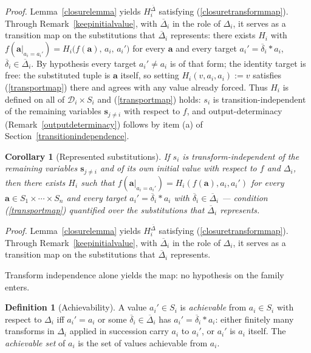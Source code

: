 \documentclass{article}
\newtheorem{corollary}[proposition]{Corollary}
\theoremstyle{definition}
\newtheorem{definition}[proposition]{Definition}
\theoremstyle{remark}
\begin{document}
\noindent \textit{Proof.} Lemma~\ref{closurelemma} yields $H_i^{\overline{\Delta}}$ satisfying (\ref{closuretransformmap}). Through Remark~\ref{keepinitialvalue}, with $\overline{\Delta}_i$ in the role of $\Delta_i$, it serves as a transition map on the substitutions that $\overline{\Delta}_i$ represents: there exists $H_i$ with $f(\boldsymbol{a}|_{a_i = a_i'}) = H_i\bigl(f(\boldsymbol{a}),\, a_i,\, a_i'\bigr)$ for every $\boldsymbol{a}$ and every target $a_i' = \overline{\delta}_i \ast a_i$, $\overline{\delta}_i \in \overline{\Delta}_i$. By hypothesis every target $a_i' \neq a_i$ is of that form; the identity target is free: the substituted tuple is $\boldsymbol{a}$ itself, so setting $H_i(v, a_i, a_i) := v$ satisfies (\ref{transportmap}) there and agrees with any value already forced. Thus $H_i$ is defined on all of $\mathcal{D}_i \times S_i$ and (\ref{transportmap}) holds: $s_i$ is transition-independent of the remaining variables $\boldsymbol{s}_{j \neq i}$ with respect to $f$, and output-determinacy (Remark~\ref{outputdeterminacy}) follows by item (a) of Section~\ref{transitionindependence}.

\newpage
\begin{corollary}[Represented substitutions]
\label{representedsubstitutions}
If $s_i$ is transform-independent of the remaining variables $\boldsymbol{s}_{j \neq i}$ and of its own initial value with respect to $f$ and $\Delta_i$, then there exists $H_i$ such that $f(\boldsymbol{a}|_{a_i = a_i'}) = H_i(f(\boldsymbol{a}), a_i, a_i')$ for every $\boldsymbol{a} \in S_1 \times \cdots \times S_n$ and every target $a_i' = \overline{\delta}_i \ast a_i$ with $\overline{\delta}_i \in \overline{\Delta}_i$ --- condition (\ref{transportmap}) quantified over the substitutions that $\overline{\Delta}_i$ represents.
\end{corollary}

\noindent \textit{Proof.} Lemma~\ref{closurelemma} yields $H_i^{\overline{\Delta}}$ satisfying (\ref{closuretransformmap}). Through Remark~\ref{keepinitialvalue}, with $\overline{\Delta}_i$ in the role of $\Delta_i$, it serves as a transition map on the substitutions that $\overline{\Delta}_i$ represents.

\noindent Transform independence alone yields the map: no hypothesis on the family enters.

\begin{definition}[Achievability]
\label{achievability}
A value $a_i' \in S_i$ is \textit{achievable} from $a_i \in S_i$ with respect to $\Delta_i$ iff $a_i' = a_i$ or some $\overline{\delta}_i \in \overline{\Delta}_i$ has $a_i' = \overline{\delta}_i \ast a_i$: either finitely many transforms in $\Delta_i$ applied in succession carry $a_i$ to $a_i'$, or $a_i'$ is $a_i$ itself. The \textit{achievable set} of $a_i$ is the set of values achievable from $a_i$.
\end{definition}
\end{document}
